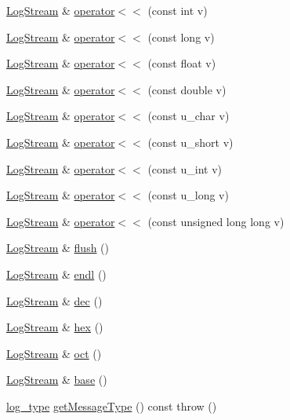 \begin{DoxyCompactItemize}
\item 
\hyperlink{a00031}{Log\-Stream} \& \hyperlink{a00031_a846256cf761f4601ef3637b6696119d7}{operator$<$$<$} (const int v)
\item 
\hyperlink{a00031}{Log\-Stream} \& \hyperlink{a00031_a82903610e544b37167f2dbd3709feeab}{operator$<$$<$} (const long v)
\item 
\hyperlink{a00031}{Log\-Stream} \& \hyperlink{a00031_adfa23ba1edc6f3d4c68169a0fd5e6ab0}{operator$<$$<$} (const float v)
\item 
\hyperlink{a00031}{Log\-Stream} \& \hyperlink{a00031_a117bd78b19cb5cb22aceda49a7e464a6}{operator$<$$<$} (const double v)
\item 
\hyperlink{a00031}{Log\-Stream} \& \hyperlink{a00031_a093fb47653a508743fbdc8849d0b3289}{operator$<$$<$} (const u\-\_\-char v)
\item 
\hyperlink{a00031}{Log\-Stream} \& \hyperlink{a00031_ac58b43508e33bf908dcd3e1ced0844a5}{operator$<$$<$} (const u\-\_\-short v)
\item 
\hyperlink{a00031}{Log\-Stream} \& \hyperlink{a00031_ac90a6103239d03af4deabb771a06ef72}{operator$<$$<$} (const u\-\_\-int v)
\item 
\hyperlink{a00031}{Log\-Stream} \& \hyperlink{a00031_a30aa88e723ce04fe2e23ce6e939671cf}{operator$<$$<$} (const u\-\_\-long v)
\item 
\hyperlink{a00031}{Log\-Stream} \& \hyperlink{a00031_ae7a5fbc7cc973038722e2c2b9de9ad1b}{operator$<$$<$} (const unsigned long long v)
\item 
\hyperlink{a00031}{Log\-Stream} \& \hyperlink{a00031_a2814d0297db8339779e995c898861e0e}{flush} ()
\item 
\hyperlink{a00031}{Log\-Stream} \& \hyperlink{a00031_ab672ebf40d6162ba7114355d2c2cc7dd}{endl} ()
\item 
\hyperlink{a00031}{Log\-Stream} \& \hyperlink{a00031_a8ed923f031fb6fd9c981d8c694c16a92}{dec} ()
\item 
\hyperlink{a00031}{Log\-Stream} \& \hyperlink{a00031_afdfaf9b54bf9ab3f95613fff8fe493a1}{hex} ()
\item 
\hyperlink{a00031}{Log\-Stream} \& \hyperlink{a00031_ab8f40d07bbf5dccf2a6c2033405dd2be}{oct} ()
\item 
\hyperlink{a00031}{Log\-Stream} \& \hyperlink{a00031_a857e9c930544fe22317b9be6a7d0d9ce}{base} ()
\item 
\hyperlink{a00089_a18db16d1f4c281bec16e637c56b0cc88}{log\-\_\-type} \hyperlink{a00031_ac3448c21e8d5528907744ab2344b170f}{get\-Message\-Type} () const   throw ()

\end{DoxyCompactItemize}
